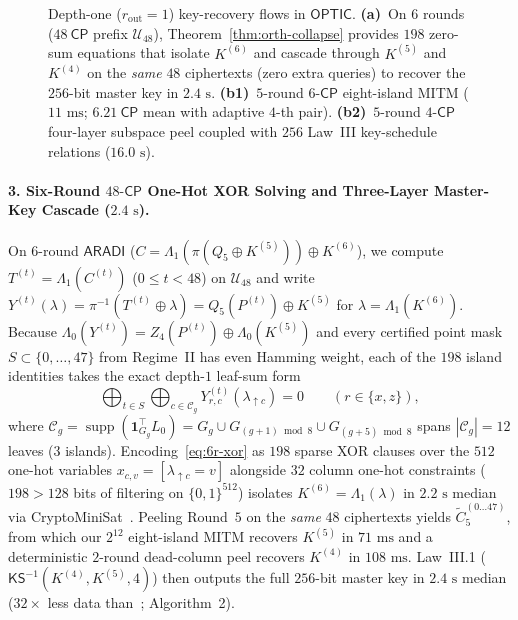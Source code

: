\documentclass[11pt,a4paper]{article}
\theoremstyle{definition}
\theoremstyle{remark}
\newcommand{\ARADI}{\mathsf{ARADI}}
\newcommand{\OPTIC}{\mathsf{OPTIC}}
\newcommand{\supp}{\operatorname{supp}}
\newcommand{\CP}{\mathsf{CP}}
\begin{document}
\begin{figure}[t!]
\caption{Depth-one ($r_{\text{out}} = 1$) key-recovery flows in $\OPTIC$. \textbf{(a)}~On $6$ rounds ($48~\CP$ prefix $\mathcal{U}_{48}$), Theorem~\ref{thm:orth-collapse} provides $198$ zero-sum equations that isolate $K^{(6)}$ and cascade through $K^{(5)}$ and $K^{(4)}$ on the \emph{same} $48$ ciphertexts (zero extra queries) to recover the $256$-bit master key in $2.4\text{ s}$. \textbf{(b1)}~$5$-round $6\text{-}\CP$ eight-island MITM ($11\text{ ms}$; $6.21~\CP$ mean with adaptive $4$-th pair). \textbf{(b2)}~$5$-round $4\text{-}\CP$ four-layer subspace peel coupled with $256$ Law~III key-schedule relations ($16.0\text{ s}$).}
\label{fig:aradi-attack}
\end{figure}

\paragraph{3. Six-Round $48\text{-}\CP$ One-Hot XOR Solving and Three-Layer Master-Key Cascade ($2.4\text{ s}$).}
On $6$-round $\ARADI$ ($C = \Lambda_1(\pi(Q_5 \oplus K^{(5)})) \oplus K^{(6)}$), we compute $T^{(t)} = \Lambda_1(C^{(t)})$ ($0 \le t < 48$) on $\mathcal{U}_{48}$ and write $Y^{(t)}(\lambda) = \pi^{-1}(T^{(t)} \oplus \lambda) = Q_5(P^{(t)}) \oplus K^{(5)}$ for $\lambda = \Lambda_1(K^{(6)})$. Because $\Lambda_0(Y^{(t)}) = Z_4(P^{(t)}) \oplus \Lambda_0(K^{(5)})$ and every certified point mask $S \subset \{0,\dots,47\}$ from Regime~II has even Hamming weight, each of the $198$ island identities takes the exact depth-$1$ leaf-sum form
\begin{equation}
\label{eq:6r-xor}
\bigoplus_{t \in S} \bigoplus_{c \in \mathcal{C}_g} Y_{r, c}^{(t)}(\lambda_{\uparrow c}) = 0 \qquad (r \in \{x, z\}),
\end{equation}
where $\mathcal{C}_g = \supp(\mathbf{1}_{G_g}^\top L_0) = G_g \cup G_{(g+1)\bmod 8} \cup G_{(g+5)\bmod 8}$ spans $|\mathcal{C}_g| = 12$ leaves ($3$ islands). Encoding~\eqref{eq:6r-xor} as $198$ sparse XOR clauses over the $512$ one-hot variables $x_{c,v} = [\lambda_{\uparrow c} = v]$ alongside $32$ column one-hot constraints ($198 > 128$ bits of filtering on $\{0,1\}^{512}$) isolates $K^{(6)} = \Lambda_1(\lambda)$ in $2.2\text{ s}$ median via CryptoMiniSat~\cite{CMS}. Peeling Round~$5$ on the \emph{same} $48$ ciphertexts yields $\tilde{C}_5^{(0\dots 47)}$, from which our $2^{12}$ eight-island MITM recovers $K^{(5)}$ in $71\text{ ms}$ and a deterministic $2$-round dead-column peel recovers $K^{(4)}$ in $108\text{ ms}$. Law~III.1 ($\mathsf{KS}^{-1}(K^{(4)}, K^{(5)}, 4)$) then outputs the full $256$-bit master key in $2.4\text{ s}$ median ($32\times$ less data than~\cite[Footnote~4]{DG25}; Algorithm~2).
\end{document}
